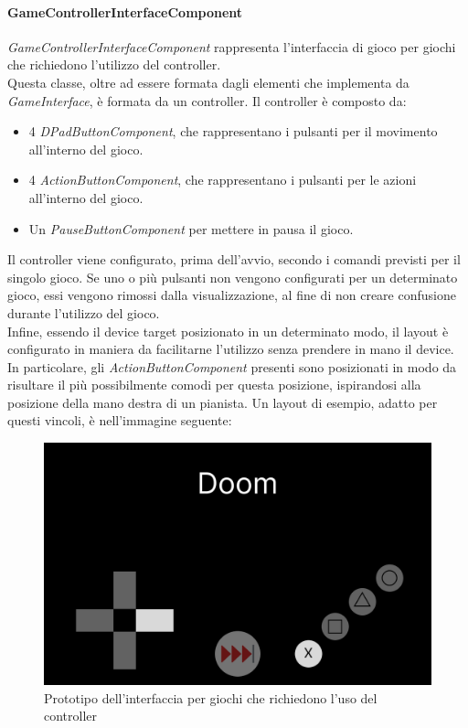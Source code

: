 \paragraph{GameControllerInterfaceComponent}
\label{paragraph:gamecontrollerinterfacecomponent}
\emph{GameControllerInterfaceComponent} rappresenta l'interfaccia di gioco per giochi che richiedono l'utilizzo del controller.\\
Questa classe, oltre ad essere formata dagli elementi che implementa da \emph{GameInterface}, è formata da un controller. Il controller è composto da:
\begin{itemize}
    \item 4 \emph{DPadButtonComponent}, che rappresentano i pulsanti per il movimento all'interno del gioco.
    \item 4 \emph{ActionButtonComponent}, che rappresentano i pulsanti per le azioni\\ all'interno del gioco.
    \item Un \emph{PauseButtonComponent} per mettere in pausa il gioco.
\end{itemize}
Il controller viene configurato, prima dell'avvio, secondo i comandi previsti per il singolo gioco. Se uno o più pulsanti non vengono configurati per un determinato gioco, essi vengono rimossi dalla visualizzazione, al fine di non creare confusione durante l'utilizzo del gioco.\\
Infine, essendo il device target posizionato in un determinato modo, il layout è configurato in maniera da facilitarne l'utilizzo senza prendere in mano il device.\\
In particolare, gli \emph{ActionButtonComponent} presenti sono posizionati in modo da risultare il più possibilmente comodi per questa posizione, ispirandosi alla posizione della mano destra di un pianista.
Un layout di esempio, adatto per questi vincoli, è nell'immagine seguente:
\begin{figure}[h]
    \centering
    \includegraphics[width=340pt]{images/prog/ControllerMockup.png}
    \caption{Prototipo dell'interfaccia per giochi che richiedono l'uso del controller}
    \label{fig:controller}
\end{figure}
